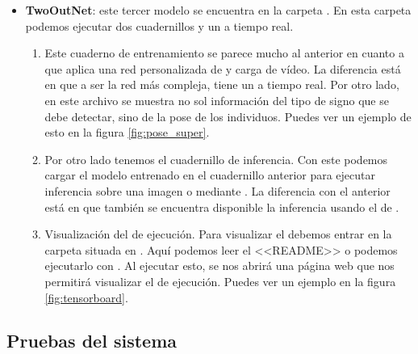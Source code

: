 \begin{itemize}
  \item \textbf{TwoOutNet}: este tercer modelo se encuentra en la carpeta . En esta carpeta podemos ejecutar dos cuadernillos y un  a tiempo real.

        \begin{enumerate}
          \item Este cuaderno de entrenamiento se parece mucho al anterior en cuanto a que aplica una red personalizada de  y carga  de vídeo. La diferencia está en que a ser la red más compleja, tiene un  a tiempo real. Por otro lado, en este archivo se muestra no sol información del tipo de signo que se debe detectar, sino de la pose de los individuos. Puedes ver un ejemplo de esto en la figura \ref{fig:pose_super}.

          \item Por otro lado tenemos el cuadernillo de inferencia. Con este podemos cargar el modelo entrenado en el cuadernillo anterior para ejecutar inferencia sobre una imagen o mediante . La diferencia con el anterior está en que también se encuentra disponible la inferencia usando el  de .

          \item Visualización del  de ejecución. Para visualizar el  debemos entrar en la carpeta situada en . Aquí podemos leer el  <<README>> o podemos ejecutarlo con . Al ejecutar esto, se nos abrirá una página web que nos permitirá visualizar el  de ejecución. Puedes ver un ejemplo en la figura \ref{fig:tensorboard}.
        \end{enumerate}

\end{itemize}



\subsection{Pruebas del sistema}

